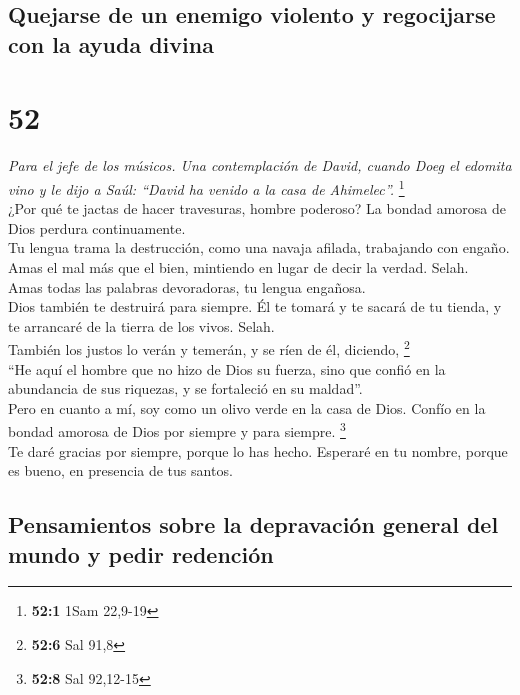 \hypertarget{quejarse-de-un-enemigo-violento-y-regocijarse-con-la-ayuda-divina}{%
\subsection{Quejarse de un enemigo violento y regocijarse con la ayuda
divina}\label{quejarse-de-un-enemigo-violento-y-regocijarse-con-la-ayuda-divina}}

\hypertarget{section-50}{%
\section{52}\label{section-50}}

\emph{Para el jefe de los músicos. Una contemplación de David, cuando
Doeg el edomita vino y le dijo a Saúl: ``David ha venido a la casa de
Ahimelec''.} \footnote{\textbf{52:1} 1Sam 22,9-19}\\
 ¿Por qué te jactas de hacer travesuras, hombre poderoso?
La bondad amorosa de Dios perdura continuamente.\\
 Tu lengua trama la destrucción, como una navaja afilada,
trabajando con engaño.\\
 Amas el mal más que el bien, mintiendo en lugar de decir
la verdad. Selah.\\
 Amas todas las palabras devoradoras, tu lengua
engañosa.\\
 Dios también te destruirá para siempre. Él te tomará y te
sacará de tu tienda, y te arrancaré de la tierra de los vivos. Selah.\\
 También los justos lo verán y temerán, y se ríen de él,
diciendo, \footnote{\textbf{52:6} Sal 91,8}\\
 ``He aquí el hombre que no hizo de Dios su fuerza, sino
que confió en la abundancia de sus riquezas, y se fortaleció en su
maldad''.\\
 Pero en cuanto a mí, soy como un olivo verde en la casa
de Dios. Confío en la bondad amorosa de Dios por siempre y para siempre.
\footnote{\textbf{52:8} Sal 92,12-15}\\
 Te daré gracias por siempre, porque lo has hecho.
Esperaré en tu nombre, porque es bueno, en presencia de tus santos.

\hypertarget{pensamientos-sobre-la-depravaciuxf3n-general-del-mundo-y-pedir-redenciuxf3n-1}{%
\subsection{Pensamientos sobre la depravación general del mundo y pedir
redención}\label{pensamientos-sobre-la-depravaciuxf3n-general-del-mundo-y-pedir-redenciuxf3n-1}}

